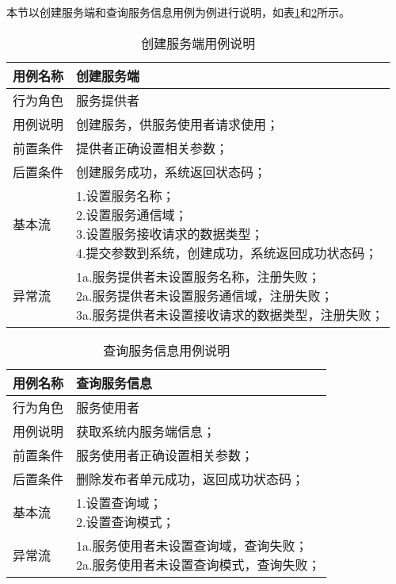 本节以创建服务端和查询服务信息用例为例进行说明，如表\ref{regist_service_server_yongli}和\ref{delete_service_server_yongli}所示。
\begin{table}[H]
  \centering\small
  \renewcommand\arraystretch{1.2}
  \caption{创建服务端用例说明}
  \label{regist_service_server_yongli}
  \begin{tabular}{ll}
    \toprule
    \multicolumn{1}{l}{用例名称} & \multicolumn{1}{l}{创建服务端}  \\
    \midrule
    行为角色 & 服务提供者\\
    用例说明 & 创建服务，供服务使用者请求使用；\\
    前置条件 & 提供者正确设置相关参数；\\
    后置条件 & 创建服务成功，系统返回状态码；\\
    基本流   & \makecell[l]{1.设置服务名称；\\2.设置服务通信域；\\3.设置服务接收请求的数据类型；\\4.提交参数到系统，创建成功，系统返回成功状态码；}\\
    异常流   & \makecell[l]{1a.服务提供者未设置服务名称，注册失败；\\2a.服务提供者未设置服务通信域，注册失败；\\3a.服务提供者未设置接收请求的数据类型，注册失败；}\\
    \bottomrule
  \end{tabular}
\end{table}
\begin{table}[H]
  \centering\small
  \renewcommand\arraystretch{1.2}
  \caption{查询服务信息用例说明}
  \label{delete_service_server_yongli}
  \begin{tabular}{ll}
    \toprule
    \multicolumn{1}{l}{用例名称} & \multicolumn{1}{l}{查询服务信息}  \\
    \midrule
    行为角色 & 服务使用者\\
    用例说明 & 获取系统内服务端信息；\\
    前置条件 & 服务使用者正确设置相关参数；\\
    后置条件 & 删除发布者单元成功，返回成功状态码；\\
    基本流   & \makecell[l]{1.设置查询域；\\2.设置查询模式；}\\
    异常流   & \makecell[l]{1a.服务使用者未设置查询域，查询失败；\\2a.服务使用者未设置查询模式，查询失败；}\\
    \bottomrule
  \end{tabular}
\end{table}


